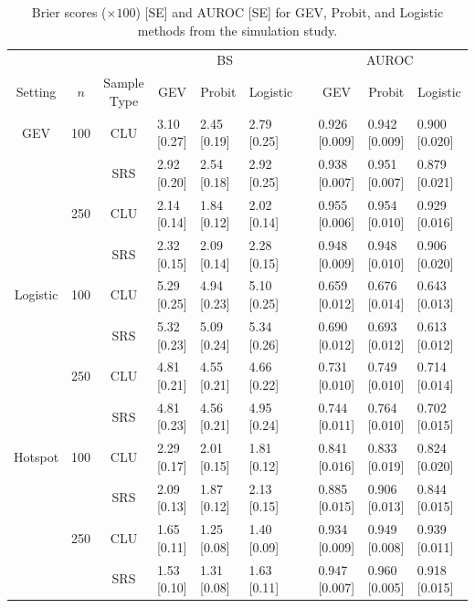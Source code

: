 \begin{table}
  \caption{Brier scores ($\times 100$) [SE] and AUROC [SE] for GEV, Probit, and Logistic methods from the simulation study.}
  \label{rbtbl:simbsresults}
  \centering
  \scriptsize
  \begin{tabular}{ccclllclll}
  \toprule
    \multicolumn{3}{c}{ }& \multicolumn{3}{c}{BS} & \phantom{abc} & \multicolumn{3}{c}{AUROC}\\
    \cmidrule{4-6} \cmidrule{8-10}
    \multicolumn{1}{c}{Setting} & \multicolumn{1}{c}{$n$} & \multicolumn{1}{c}{Sample Type} & \multicolumn{1}{c}{GEV}    & \multicolumn{1}{c}{Probit} & \multicolumn{1}{c}{Logistic} & \phantom{abc} & \multicolumn{1}{c}{GEV}    & \multicolumn{1}{c}{Probit} & \multicolumn{1}{c}{Logistic} \\
  \midrule
  GEV & 100 & CLU & 3.10 [0.27] & 2.45 [0.19] & 2.79 [0.25] && 0.926 [0.009] &
      0.942 [0.009] & 0.900 [0.020]\\
      &     & SRS & 2.92 [0.20] & 2.54 [0.18] & 2.92 [0.25] && 0.938 [0.007] & 0.951 [0.007] & 0.879 [0.021]\\
      & 250 & CLU & 2.14 [0.14] & 1.84 [0.12] & 2.02 [0.14] && 0.955 [0.006] & 0.954 [0.010] & 0.929 [0.016]\\
      &     & SRS & 2.32 [0.15] & 2.09 [0.14] & 2.28 [0.15] && 0.948 [0.009] & 0.948 [0.010] & 0.906 [0.020]\\
  \midrule
  Logistic & 100 & CLU & 5.29 [0.25] & 4.94 [0.23] & 5.10 [0.25] && 0.659 [0.012]
           & 0.676 [0.014] & 0.643 [0.013]\\
           &     & SRS & 5.32 [0.23] & 5.09 [0.24] & 5.34 [0.26] && 0.690 [0.012] & 0.693 [0.012] & 0.613 [0.012]\\
           & 250 & CLU & 4.81 [0.21] & 4.55 [0.21] & 4.66 [0.22] && 0.731 [0.010] & 0.749 [0.010] & 0.714 [0.014]\\
           &     & SRS & 4.81 [0.23] & 4.56 [0.21] & 4.95 [0.24] && 0.744 [0.011] & 0.764 [0.010] & 0.702 [0.015]\\
  \midrule
  Hotspot & 100 & CLU & 2.29 [0.17] & 2.01 [0.15] & 1.81 [0.12] && 0.841 [0.016] &        0.833 [0.019] & 0.824 [0.020]\\
          &     & SRS & 2.09 [0.13] & 1.87 [0.12] & 2.13 [0.15] && 0.885 [0.015] &  0.906 [0.013] & 0.844 [0.015]\\
          & 250 & CLU & 1.65 [0.11] & 1.25 [0.08] & 1.40 [0.09] && 0.934 [0.009] &  0.949 [0.008] & 0.939 [0.011]\\
          &     & SRS & 1.53 [0.10] & 1.31 [0.08] & 1.63 [0.11] && 0.947 [0.007] &  0.960 [0.005] & 0.918 [0.015]\\
  \bottomrule
  \end{tabular}
\end{table}

